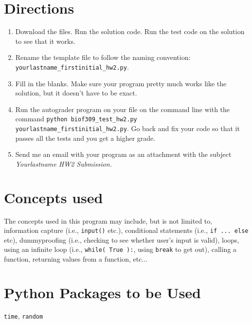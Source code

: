 \documentclass[11pt]{amsart}
\begin{document}
\section*{Directions}
\begin{enumerate}
	\item Download the files. Run the solution code. Run the test code on the solution to see
        that it works.
	\item Rename the template file to follow the naming convention: \\ \texttt{yourlastname_firstinitial_hw2.py}.
	\item Fill in the blanks. Make sure your program pretty much works like the solution, but it doesn't have to be exact.
	\item Run the autograder program on your file on the command line with the command \texttt{python biof309_test_hw2.py yourlastname_firstinitial_hw2.py}. Go back and fix your code so that it passes all the tests and you get a higher grade.
	\item Send me an email with your program as an attachment with the subject \\
        \em{Yourlastname HW2 Submission}.
\end{enumerate}

\section*{Concepts used}
The concepts used in this program may include, but is not limited to, information capture (i.e., \texttt{input()} etc.), conditional statements (i.e., \texttt{if ... else} etc), dummyproofing (i.e., checking to see whether user's input is valid), loops, using an infinite loop (i.e., \texttt{while( True ):}, using \texttt{break} to get out), calling a function, returning values from a function, etc...

\section*{Python Packages to be Used}
\texttt{time}, \texttt{random}
\end{document}
